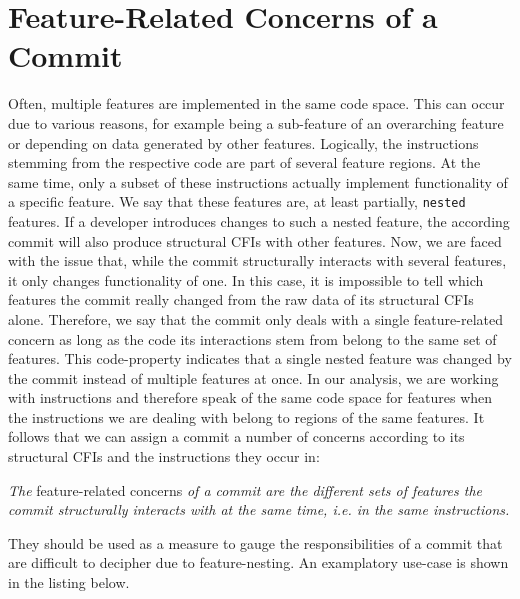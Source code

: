 \section{Feature-Related Concerns of a Commit}\label{sec:commit_concerns}

Often, multiple features are implemented in the same code space.
This can occur due to various reasons, for example being a sub-feature of an overarching feature or depending on data generated by other features.
Logically, the instructions stemming from the respective code are part of several feature regions.
At the same time, only a subset of these instructions actually implement functionality of a specific feature.
We say that these features are, at least partially, \texttt{nested} features.
If a developer introduces changes to such a nested feature, the according commit will also produce structural CFIs with other features.
Now, we are faced with the issue that, while the commit structurally interacts with several features, it only changes functionality of one.
In this case, it is impossible to tell which features the commit really changed from the raw data of its structural CFIs alone.
Therefore, we say that the commit only deals with a single feature-related concern as long as the code its interactions stem from belong to the same set of features.
This code-property indicates that a single nested feature was changed by the commit instead of multiple features at once.
In our analysis, we are working with instructions and therefore speak of the same code space for features when the instructions we are dealing with belong to regions of the same features.
It follows that we can assign a commit a number of concerns according to its structural CFIs and the instructions they occur in:
\begin{definition} \label{def:commit_concerns}
\emph{The} feature-related concerns \emph{of a commit are the different sets of features the commit structurally interacts with at the same time, i.e. in the same instructions.}
\end{definition}
They should be used as a measure to gauge the responsibilities of a commit that are difficult to decipher due to feature-nesting. 
An examplatory use-case is shown in the listing below. \\
                             
